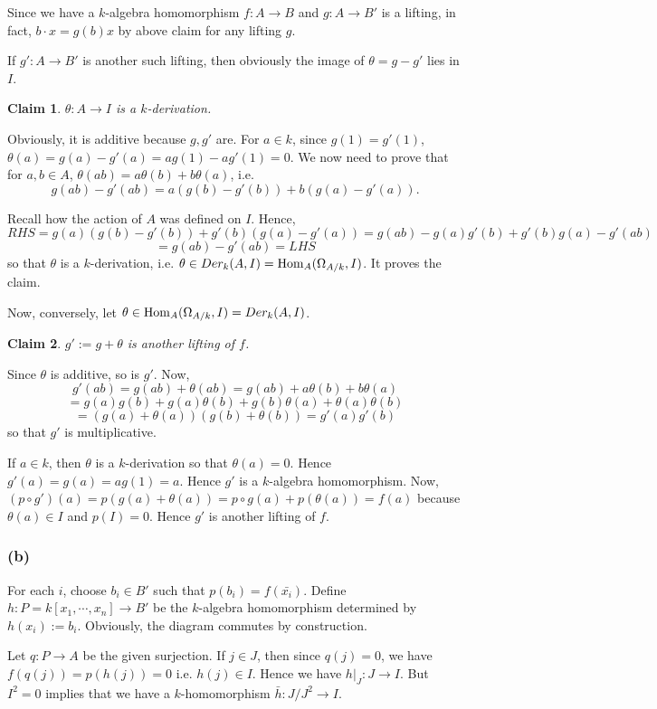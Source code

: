\documentclass[11pt]{amsart}          %
\newtheorem*{claim}{Claim}
\renewcommand{\hom}{{\rm Hom}}
\begin{document}
Since we have a $k$-algebra homomorphism $f: A \to B$ and $g: A \to B'$ is a lifting, in fact, $b \cdot x = g(b) x$ by above claim for any lifting $g$.

If $g' : A \to B'$ is another such lifting, then obviously the image of $\theta = g - g'$ lies in $I$.
\begin{claim} $\theta: A \to I$ is a $k$-derivation.
\end{claim}

Obviously, it is additive because $g, g'$ are. For $a \in k$, since $g(1) = g'(1)$, $\theta(a) = g(a) - g'(a) = a g(1) - ag'(1) = 0$. We now need to prove that for $a, b \in A$, $\theta (ab) = a \theta(b) + b \theta(a)$, i.e. $$g(ab) - g'(ab) = a (g(b) - g'(b)) + b(g(a) - g'(a)).$$ 

Recall how the action of $A$ was defined on $I$. Hence, $$RHS = g(a) (g(b) - g'(b)) + g'(b)(g(a) - g'(a)) = g(ab) - g(a) g'(b) + g'(b) g(a) - g'(ab)$$
$$= g(ab)-g'(ab) = LHS$$ so that $\theta$ is a $k$-derivation, i.e. $\theta \in Der_k (A, I) = \hom_A (\Omega_{A/k}, I)$. It proves the claim.

\vskip0.3cm

Now, conversely, let $\theta \in \hom_A(\Omega_{A/k}, I) = Der_k(A, I)$.
\begin{claim}$g' := g + \theta$ is another lifting of $f$.
\end{claim}

Since $\theta$ is additive, so is $g'$. Now, 
$$g'(ab) = g(ab) + \theta(ab) = g(ab) + a \theta(b) + b \theta(a)$$
$$ = g(a) g(b) + g(a) \theta(b) + g(b) \theta(a) + \theta(a) \theta(b) $$
$$= (g(a) + \theta(a)) (g(b) + \theta(b)) = g'(a) g'(b)$$ so that $g'$ is multiplicative.

If $a \in k$, then $\theta$ is a $k$-derivation so that $\theta(a) = 0$. Hence $g'(a) = g(a) = ag(1) = a$. Hence $g'$ is a $k$-algebra homomorphism. Now, $(p \circ g') (a) = p(g(a) + \theta(a)) = p \circ g(a) + p(\theta(a)) = f(a)$ because $\theta(a) \in I$ and $p(I) = 0$. Hence $g'$ is another lifting of $f$.

\subsubsection*{(b)} For each $i$, choose $b_i \in B'$ such that $p(b_i) = f(\bar{x_i})$. Define $h: P= k[x_1, \cdots, x_n ] \to B'$ be the $k$-algebra homomorphism determined by $h(x_i ) := b_i$. Obviously, the diagram commutes by construction.

Let $q : P \to A$ be the given surjection. If $j \in J$, then since $q(j) = 0$, we have $f(q(j)) = p(h(j)) = 0$ i.e. $h(j) \in I$. Hence we have $h|_J : J \to I$. But $I^2 = 0$ implies that we have a $k$-homomorphism $\bar{h} : J/J^2 \to I$.
\end{document}
